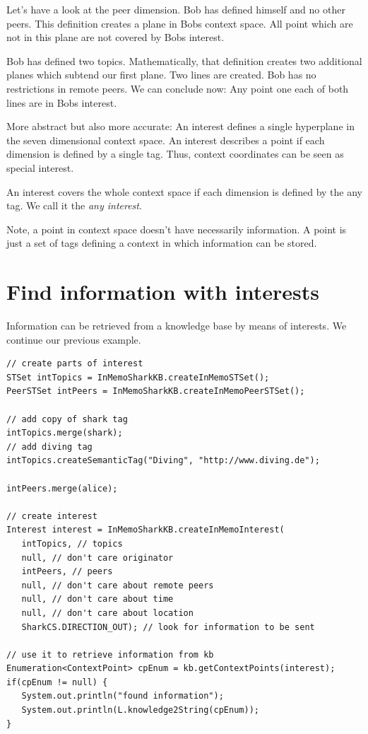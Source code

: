 Let's have a look at the peer dimension. Bob has defined himself and no other peers. This definition creates a plane in Bobs context space. All point which are not in this plane are not covered by Bobs interest.

Bob has defined two topics. Mathematically, that definition creates two additional planes which subtend our first plane. Two lines are created. Bob has no restrictions in remote peers. We can conclude now: Any point one each of both lines are in Bobs interest.

More abstract but also more accurate: An interest defines a single hyperplane in the seven dimensional context space. An interest describes a point if each dimension is defined by a single tag. Thus, context coordinates can be seen as special interest.

An interest covers the whole context space if each dimension is defined by the any tag. We call it the {\it any interest}.

Note, a point in context space doesn't have necessarily information. A point is just a set of tags defining a context in which information can be stored.

\section{Find information with interests}
Information can be retrieved from a knowledge base by means of interests.
We continue our previous example.

\begin{verbatim}
// create parts of interest
STSet intTopics = InMemoSharkKB.createInMemoSTSet();
PeerSTSet intPeers = InMemoSharkKB.createInMemoPeerSTSet();

// add copy of shark tag
intTopics.merge(shark);
// add diving tag
intTopics.createSemanticTag("Diving", "http://www.diving.de");

intPeers.merge(alice);

// create interest
Interest interest = InMemoSharkKB.createInMemoInterest(
   intTopics, // topics
   null, // don't care originator
   intPeers, // peers
   null, // don't care about remote peers
   null, // don't care about time
   null, // don't care about location
   SharkCS.DIRECTION_OUT); // look for information to be sent

// use it to retrieve information from kb
Enumeration<ContextPoint> cpEnum = kb.getContextPoints(interest);
if(cpEnum != null) {
   System.out.println("found information");
   System.out.println(L.knowledge2String(cpEnum));
}
\end{verbatim}


